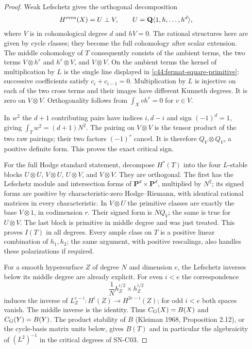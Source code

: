 \documentclass[11pt]{article}
\theoremstyle{remark}\newtheorem{remark}[theorem]{Remark}
\begin{document}
\begin{proof}
Weak Lefschetz gives the orthogonal decomposition
\[
 H^{\rm even}(X)=U\perp V,\qquad
 U=\mathbf Q\langle1,h,\ldots,h^d\rangle,
\]
where $V$ is in cohomological degree $d$ and $hV=0$.
The rational structures here are given by cycle classes;
they become the full cohomology after scalar extension.
The middle cohomology of $T$ consequently consists of the
ambient terms, the two terms $V\otimes h^r$ and
$h^r\otimes V$, and $V\otimes V$.  On the ambient
terms the kernel of multiplication by $L$ is the single
line displayed in \eqref{c44:fermat-square-primitive}:
successive coefficients satisfy $c_i+c_{i-1}=0$.
Multiplication by $L$ is injective on each of the two
cross terms and their images have different Kunneth
degrees.  It is zero on $V\otimes V$.  Orthogonality
follows from $\int_Xvh^r=0$ for $v\in V$.

In $w^2$ the $d+1$ contributing pairs have indices
$i,d-i$ and sign $(-1)^d=1$, giving
$\int_Tw^2=(d+1)N^2$.  The pairing on $V\otimes V$
is the tensor product of the two raw pairings; their
two factors $(-1)^r$ cancel.  It is therefore
$Q_V\otimes Q_V$, a positive definite form.  This proves
the exact critical sign.

For the full Hodge standard statement, decompose
$H^*(T)$ into the four $L$-stable blocks
$U\otimes U$, $V\otimes U$, $U\otimes V$, and
$V\otimes V$.  They are orthogonal.  The first has
the Lefschetz module and intersection forms of
$\mathbf P^d\times\mathbf P^d$, multiplied by $N^2$;
its signed forms are positive by characteristic-zero
Hodge--Riemann, with identical rational matrices in
every characteristic.  In $V\otimes U$ the primitive
classes are exactly the base $V\otimes1$, in
codimension $r$.  Their signed form is $NQ_V$;
the same is true for $U\otimes V$.  The last block
is primitive in middle degree and was just treated.
This proves $I(T)$ in all degrees.  Every ample
class on $T$ is a positive linear combination of
$h_1,h_2$; the same argument, with positive rescalings,
also handles these polarizations if required.

For a smooth hypersurface $Z$ of degree $N$ and
dimension $e$, the Lefschetz inverses below its middle
degree are already explicit.  For even $i<e$ the
correspondence
\[
 \frac1N h_Z^{i/2}\times h_Z^{i/2}
\]
induces the inverse of
$L_Z^{e-i}:H^i(Z)\longrightarrow H^{2e-i}(Z)$;
for odd $i<e$ both spaces vanish.  The middle inverse
is the identity.  Thus $C_{\rm G}(X)=B(X)$ and
$C_{\rm G}(Y)=B(Y)$.  The product stability of $B$
(Kleiman 1968, Proposition 2.12), or the cycle-basis
matrix units below, gives $B(T)$ and in particular
the algebraicity of $(L^2)^{-1}$ in the critical
degrees of SN-C03.


\end{proof}
\end{document}
